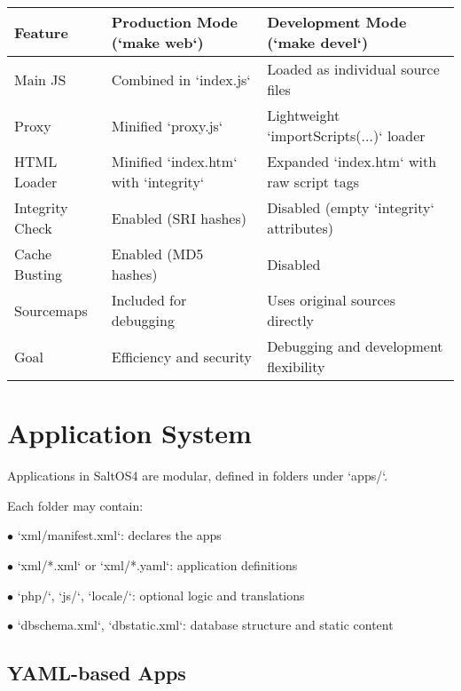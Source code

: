 \documentclass[a4paper]{article}
\begin{document}
\begin{center}\begin{tabular}{|l|l|l|}
\hline \textbf{Feature} & \textbf{Production Mode (`make web`)} & \textbf{Development Mode (`make devel`)} \\
\hline Main JS & Combined in `index.js` & Loaded as individual source files \\
\hline Proxy & Minified `proxy.js` & Lightweight `importScripts(...)` loader \\
\hline HTML Loader & Minified `index.htm` with `integrity` & Expanded `index.htm` with raw script tags \\
\hline Integrity Check & Enabled (SRI hashes) & Disabled (empty `integrity` attributes) \\
\hline Cache Busting & Enabled (MD5 hashes) & Disabled \\
\hline Sourcemaps & Included for debugging & Uses original sources directly \\
\hline Goal & Efficiency and security & Debugging and development flexibility \\
\hline \end{tabular}\end{center}


\hypertarget{toc48}{}
\section{Application System}

Applications in SaltOS4 are modular, defined in folders under `apps/`.

Each folder may contain:

\begin{compactitem}
\item[\color{myblue}$\bullet$] `xml/manifest.xml`: declares the apps
\item[\color{myblue}$\bullet$] `xml/*.xml` or `xml/*.yaml`: application definitions
\item[\color{myblue}$\bullet$] `php/`, `js/`, `locale/`: optional logic and translations
\item[\color{myblue}$\bullet$] `dbschema.xml`, `dbstatic.xml`: database structure and static content
\end{compactitem}

\hypertarget{toc49}{}
\subsection{YAML-based Apps}
\end{document}
